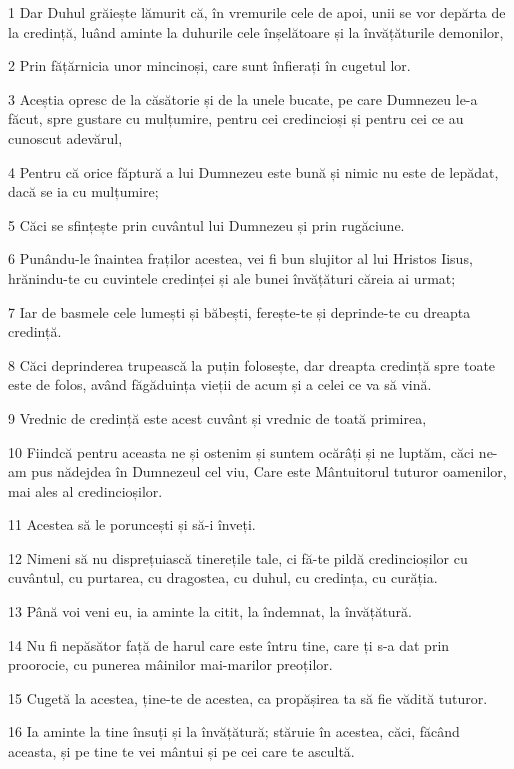 \par 1 Dar Duhul grăiește lămurit că, în vremurile cele de apoi, unii se vor depărta de la credință, luând aminte la duhurile cele înșelătoare și la învățăturile demonilor,
\par 2 Prin fățărnicia unor mincinoși, care sunt înfierați în cugetul lor.
\par 3 Aceștia opresc de la căsătorie și de la unele bucate, pe care Dumnezeu le-a făcut, spre gustare cu mulțumire, pentru cei credincioși și pentru cei ce au cunoscut adevărul,
\par 4 Pentru că orice făptură a lui Dumnezeu este bună și nimic nu este de lepădat, dacă se ia cu mulțumire;
\par 5 Căci se sfințește prin cuvântul lui Dumnezeu și prin rugăciune.
\par 6 Punându-le înaintea fraților acestea, vei fi bun slujitor al lui Hristos Iisus, hrănindu-te cu cuvintele credinței și ale bunei învățături căreia ai urmat;
\par 7 Iar de basmele cele lumești și băbești, ferește-te și deprinde-te cu dreapta credință.
\par 8 Căci deprinderea trupească la puțin folosește, dar dreapta credință spre toate este de folos, având făgăduința vieții de acum și a celei ce va să vină.
\par 9 Vrednic de credință este acest cuvânt și vrednic de toată primirea,
\par 10 Fiindcă pentru aceasta ne și ostenim și suntem ocărâți și ne luptăm, căci ne-am pus nădejdea în Dumnezeul cel viu, Care este Mântuitorul tuturor oamenilor, mai ales al credincioșilor.
\par 11 Acestea să le poruncești și să-i înveți.
\par 12 Nimeni să nu disprețuiască tinerețile tale, ci fă-te pildă credincioșilor cu cuvântul, cu purtarea, cu dragostea, cu duhul, cu credința, cu curăția.
\par 13 Până voi veni eu, ia aminte la citit, la îndemnat, la învățătură.
\par 14 Nu fi nepăsător față de harul care este întru tine, care ți s-a dat prin proorocie, cu punerea mâinilor mai-marilor preoților.
\par 15 Cugetă la acestea, ține-te de acestea, ca propășirea ta să fie vădită tuturor.
\par 16 Ia aminte la tine însuți și la învățătură; stăruie în acestea, căci, făcând aceasta, și pe tine te vei mântui și pe cei care te ascultă.

